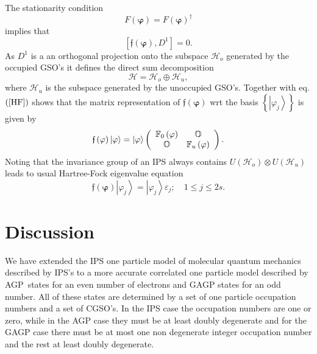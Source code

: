\documentclass[aps,preprint]{revtex4}%
\begin{document}
The stationarity condition
\begin{equation}
F\left(  \mathbf{\varphi}\right)  =F\left(  \mathbf{\varphi}\right)
^{\dagger}%
\end{equation}
implies that
\begin{equation}
\left[  \mathfrak{f}\left(  \mathbf{\varphi}\right)  ,D^{1}\right]
=0.\label{HF}%
\end{equation}
As $D^{1}$ is a an orthogonal projection onto the subspace $\mathcal{H}_{o}$
generated by the occupied GSO's it defines the direct sum decomposition
\begin{equation}
\mathcal{H=H}_{o}\oplus\mathcal{H}_{u},\label{DS}%
\end{equation}
where $\mathcal{H}_{u}$ is the subspace generated by the unoccupied GSO's.
Together with eq. $\left(  \ref{HF}\right)  $ shows that the matrix
representation of $\mathfrak{f}\left(  \mathbf{\varphi}\right)  $ wrt the
basis $\left\{  \left\vert \varphi_{j}\right\rangle \right\}  $ is given by
\begin{equation}
\mathfrak{f}\left(  \mathbf{\varphi}\right)  \left\vert \mathbf{\varphi
}\right\rangle =\left\vert \mathbf{\varphi}\right\rangle \left(
\begin{array}
[c]{cc}%
\mathbb{F}_{0}\left(  \mathbf{\varphi}\right)   & \mathbb{O}\\
\mathbb{O} & \mathbb{F}_{u}\left(  \mathbf{\varphi}\right)
\end{array}
\right)  .
\end{equation}
Noting that the invariance group of an IPS always contains $U\left(
\mathcal{H}_{o}\right)  \otimes U\left(  \mathcal{H}_{u}\right)  $ leads to
usual Hartree-Fock eigenvalue equation
\begin{equation}
\mathfrak{f}\left(  \mathbf{\varphi}\right)  \left\vert \varphi_{j}%
\right\rangle =\left\vert \varphi_{j}\right\rangle \varepsilon_{j};\quad1\leq
j\leq2s.
\end{equation}


\section{Discussion\label{Discussion}}

We have extended the IPS one particle model of molecular quantum mechanics
described by IPS's to a more accurate correlated one particle model described
by AGP\ states for an even number of electrons and GAGP states for an odd
number. All of these states are determined by a set of one particle occupation
numbers and a set of CGSO's. In the IPS case the occupation numbers are one or
zero, while in the AGP case they must be at least doubly degenerate and for
the GAGP case there must be at most one non degenerate integer occupation
number and the rest at least doubly degenerate.
\end{document}

